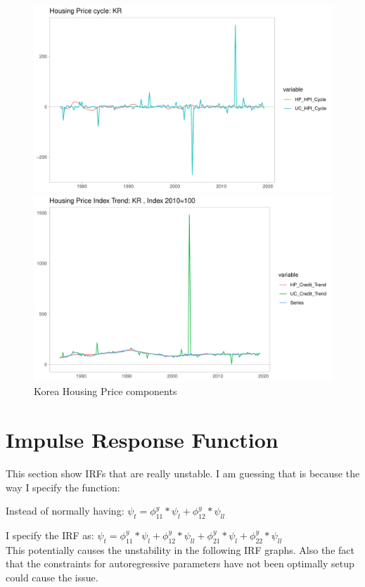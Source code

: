 \documentclass[fleqn]{article}
\begin{document}
\begin{outline}[enumerate]
\begin{figure}[h!]
	\caption{Korea Housing Price components}	
	\centerline{\includegraphics[scale=0.7]{../Output/Graphs/HP_cycle_KR.pdf}}
	\centerline{\includegraphics[scale=0.7]{../Output/Graphs/HP_trend_KR.pdf}}
\end{figure}

\clearpage

\section{Impulse Response Function}



This section show IRFs that are really unstable. I am guessing that is because the way I specify the function:

Instead of normally having: $\psi_t = \phi^y_{11}*\psi_l + \phi^y_{12}*\psi_{ll}$

I specify the IRF as: $\psi_t = \phi^y_{11}*\psi_l + \phi^y_{12}*\psi_{ll} + \phi^y_{21}*\psi_l + \phi^y_{22}*\psi_{ll} $
\\
This potentially causes the unstability in the following IRF graphs. Also the fact that the constraints for autoregressive parameters have not been optimally setup could cause the issue.



\end{outline}
\end{document}
